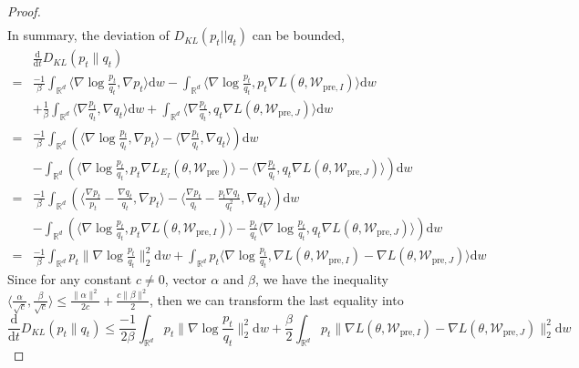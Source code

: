 \begin{proof}
$$\begin{aligned}
	\end{aligned}
	$$
	In summary, the deviation of $D_{KL}(p_t||q_t)$ can be bounded,
	$$
	\begin{aligned}
		&\frac{\mathrm{d}}{\mathrm{d}t}D_{KL}(p_t \parallel q_t) \\
		=& \frac{-1}\beta\int_{\mathbb{R}^d}\langle\nabla\log\frac{p_t}{q_t},\nabla p_t\rangle\mathrm{d}w-\int_{\mathbb{R}^d}\langle\nabla\log\frac{p_t}{q_t},p_t\nabla L(\theta, \mathcal{W}_{\text{pre},I})\rangle\mathrm{d}w\\
		&+ \frac{1}\beta\int_{\mathbb{R}^d}\langle\nabla\frac{p_t}{q_t},\nabla q_t\rangle\mathrm{d}w + \int_{\mathbb{R}^d}\langle\nabla\frac{p_t}{q_t},q_t\nabla L(\theta, \mathcal{W}_{\text{pre},J})\rangle\mathrm{d}w \\
		=& \frac{-1}{\beta}\int_{\mathbb{R}^d}\left(\langle\nabla\log\frac{p_t}{q_t},\nabla p_t\rangle-\langle\nabla\frac{p_t}{q_t},\nabla q_t\rangle\right)\mathrm{d}w\\
		&- \int_{\mathbb{R}^d}\left(\langle\nabla\log\frac{p_t}{q_t},p_t\nabla L_{E_I}(\theta, \mathcal{W}_{\text{pre}})\rangle-\langle\nabla\frac{p_t}{q_t},q_t\nabla L(\theta, \mathcal{W}_{\text{pre},J})\rangle\right)\mathrm{d}w \\
		=& \frac{-1}{\beta}\int_{\mathbb{R}^d}\left(\langle \frac{\nabla p_t}{p_t}-\frac{\nabla q_t}{q_t},\nabla p_t\rangle-\langle\frac{\nabla p_t}{q_t}-\frac{p_t\nabla q_t}{q_t^2},\nabla q_t\rangle\right)\mathrm{d}w \\ & - \int_{\mathbb{R}^d}\left(\langle\nabla\log\frac{p_t}{q_t},p_t\nabla L(\theta, \mathcal{W}_{\text{pre},I})\rangle-\frac{p_t}{q_t}\langle\nabla\log\frac{p_t}{q_t},q_t\nabla L(\theta, \mathcal{W}_{\text{pre},J})\rangle\right)\mathrm{d}w \\
		=& \frac{-1}{\beta}\int_{\mathbb{R}^d}p_t\big\|\nabla \log \frac{p_t}{q_t}\big\|^2_2 \mathrm{d}w + \int_{\mathbb{R}^d}p_t\langle\nabla \log \frac{p_t}{q_t}, \nabla L(\theta, \mathcal{W}_{\text{pre},I})-\nabla L(\theta, \mathcal{W}_{\text{pre},J})\rangle\mathrm{d}w
	\end{aligned}
	$$
	Since for any constant $c \neq 0$, vector $\alpha$ and $\beta$, we have the inequality $\langle\frac{\alpha}{\sqrt{c}},\frac{\beta}{\sqrt{c}}\rangle \leq \frac{\|\alpha\|^2}{2c}+\frac{c\|\beta\|^2}{2}$, then we can transform the last equality into
	$$
	\frac{\mathrm{d}}{\mathrm{d}t}D_{KL}(p_t \parallel q_t) \leq \frac{-1}{2\beta}\int_{\mathbb{R}^d}p_t\big\|\nabla \log \frac{p_t}{q_t}\big\|^2_2 \mathrm{d}w + \frac{\beta}{2}\int_{\mathbb{R}^d} p_t \big\|\nabla L(\theta, \mathcal{W}_{\text{pre},I})-\nabla L(\theta, \mathcal{W}_{\text{pre},J})\big\|^2_2\mathrm{d}w
$$
\end{proof}

